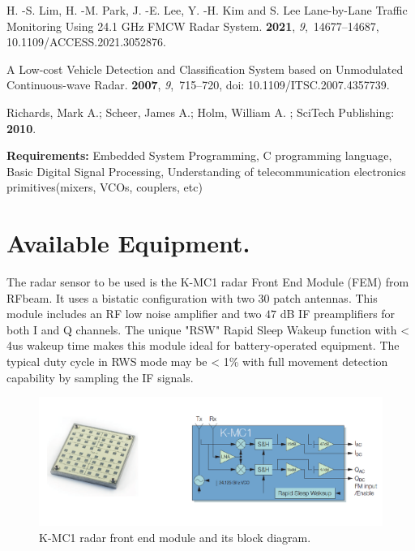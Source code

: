 \documentclass[12pt]{article}
\begin{document}
\begin{thebibliography}{999}

H. -S. Lim, H. -M. Park, J. -E. Lee, Y. -H. Kim and S. Lee
\newblock Lane-by-Lane Traffic Monitoring Using 24.1 GHz FMCW Radar System.
 {\bf 2021}, {\em 9},~14677--14687, 10.1109/ACCESS.2021.3052876. 

\newblock A Low-cost Vehicle Detection and Classification System based on Unmodulated Continuous-wave Radar.
 {\bf 2007}, {\em 9},~715--720, doi: 10.1109/ITSC.2007.4357739.

Richards, Mark A.; Scheer, James A.; Holm, William A.
; SciTech Publishing: {\bf 2010}.

\end{thebibliography}

\textbf{Requirements:} Embedded System Programming, C programming language, Basic Digital Signal Processing, Understanding of telecommunication electronics primitives(mixers, VCOs, couplers, etc)


\section*{Available Equipment.}

The radar sensor to be used is the K-MC1 radar Front End Module (FEM) from RFbeam. It uses a bistatic configuration with two 30 patch antennas. This module includes an RF low noise amplifier and two $47$ dB IF preamplifiers for both I and Q channels. The unique "RSW" Rapid Sleep Wakeup function with < 4us wakeup time makes this module ideal for battery-operated equipment. The typical duty cycle in RWS mode may be < 1\% with full movement detection capability by sampling the IF signals.

\begin{figure}[H]
\centering
\captionsetup{justification=centering}
\includegraphics[width=0.9\linewidth,keepaspectratio]{pics/radar_fem.png}
\caption{ K-MC1 radar front end module and its block diagram. \label{image:radar_fem}}
\end{figure}
\end{document}
